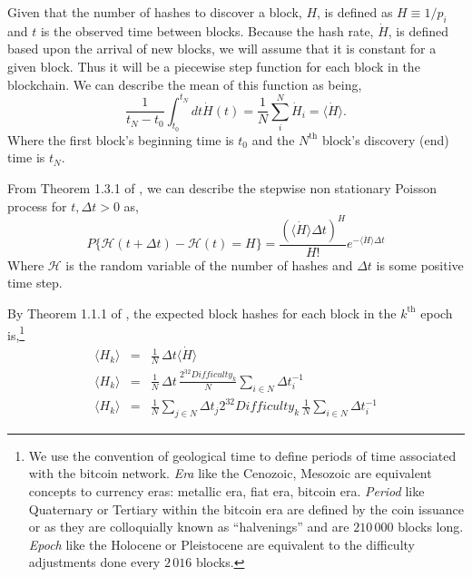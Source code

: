\documentclass[runningheads]{llncs}
\begin{document}
Given that the number of hashes to discover a block, $H$, is defined as $H \equiv 1/p_i$ and $t$ is the observed time between blocks.
Because the hash rate, $\dot{H}$, is defined based upon the arrival of new blocks, we will assume that it is constant for a given block.
Thus it will be a piecewise step function for each block in the blockchain.
We can describe the mean of this function as being,
\begin{equation}
    \frac{1}{t_N - t_0}\int_{t_0}^{t_N} dt \dot{H}(t) =  \frac{1}{N}\sum_i^N \dot{H}_i = \langle \dot{H} \rangle. \label{eq:7}
\end{equation}
Where the first block's beginning time is $t_0$ and the $N^{\mbox{th}}$ block's discovery (end) time is $t_N$.

From Theorem 1.3.1 of \cite{tijms2003first}, we can describe the stepwise non stationary Poisson process for $t,\Delta t >0$ as,
\begin{equation}
    P\lbrace \mathcal{H}(t + \Delta t) - \mathcal{H}(t)= H\rbrace = \frac{(\langle \dot{H} \rangle \Delta t)^H}{H!}e^{-\langle \dot{H} \rangle \Delta t}\label{eq:8}
\end{equation}
Where $\mathcal{H}$ is the random variable of the number of hashes and $\Delta t$ is some positive time step.

By Theorem 1.1.1 of \cite{tijms2003first}, the expected block hashes for each block in the $k^{\mathrm{th}}$ epoch is,\footnote{
    We use the convention of geological time to define periods of time associated with the bitcoin network.
    \emph{Era} like the Cenozoic, Mesozoic are equivalent concepts to currency eras: metallic era, fiat era, bitcoin era.
    \emph{Period} like Quaternary or Tertiary within the bitcoin era are defined by the coin issuance or as they are colloquially known as ``halvenings'' and are $210\,000$ blocks long.
    \emph{Epoch} like the Holocene or Pleistocene are equivalent to the difficulty adjustments done every $2\,016$ blocks.
}
\begin{eqnarray}
    \langle H_k \rangle &=& \frac{1}{N}\,\Delta t \langle \dot{H} \rangle  \nonumber\\
    \langle H_k \rangle &=& \frac{1}{N}\,\Delta t\, \frac{2^{32}Difficulty_k}{N} \sum_{i\in N} \Delta t_i^{-1} \nonumber\\
    \langle H_k \rangle &=& \frac{1}{N}\sum_{j \in N} \Delta t_j 2^{32}Difficulty_k\,\frac{1}{N} \sum_{i\in N} \Delta t_i^{-1} \label{eq:18}
\end{eqnarray}
\end{document}
